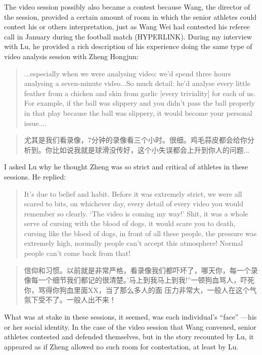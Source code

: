 \begin{CJK}{UTF8}{gbsn}
The video session possibly also became a contest because Wang, the director of the session, provided a certain amount of room in which the senior athletes could contest his or others interpretation, just as Wang Wei had contested his referee call in January during the football match (HYPERLINK). During my interview with Lu, he provided a rich description of his experience doing the same type of video analysis session with Zheng Hongjun:

\begin{quotation}
  ...especially when we were analysing video: we'd spend three hours analysing a seven-minute video...So much detail: he'd analyse every little feather from a chicken and skin from garlic [every triviality] for each of us. For example, if the ball was slippery and you didn't pass the ball properly in that play because the ball was slippery, it would become your personal issue....
\end{quotation}


\begin{quotation}
    尤其是我们看录像，7分钟的录像看三个小时。很细。鸡毛蒜皮都会给你分析到。你比如说我就是球滑没传好，这个小失误都会上升到你人的问题...
\end{quotation}



I asked Lu why he thought Zheng was so strict and critical of athletes in these sessions.  He replied:

\begin{quotation}
    It's due to belief and habit. Before it was extremely strict, we were all scared to bits, on whichever day, every detail of every video you would remember so clearly. `The video is coming my way!'  Shit, it was a whole serve of cursing with the blood of dogs, it would scare you to death, cursing like the blood of dogs, in front of all these people, the pressure was extremely high, normally people can’t accept this atmosphere! Normal people can’t come back from that!
\end{quotation}


  \begin{quotation}
      信仰和习惯。以前就是非常严格，看录像我们都吓坏了，哪天你，每一个录像每一个细节我们都记的很清楚。'马上到我马上到我!''一顿狗血骂人，吓死你，骂得你狗血里面XX，当了那么多人的面 压力非常大，一般人在这个气氛下受不了。一般人出不来！
  \end{quotation}


What was at stake in these sessions, it seemed, was each individual's ``face'' ---his or her social identity.  In the case of the video session that Wang convened, senior athletes contested and defended themselves, but in the story recounted by Lu, it appeared as if Zheng allowed no such room for contestation, at least by Lu.




\end{CJK}
